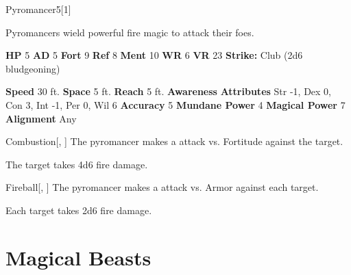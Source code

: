   
  \begin{monsection}{Pyromancer}{5}[1]
    \vspace{-1em}\vspace{-1em}
    \vspace{0em}

    
      Pyromancers wield powerful fire magic to attack their foes.
    
    

    \begin{spellcontent}
      \begin{spelltargetinginfo}
        \pari \textbf{HP} 5 \monsep
          \textbf{AD} 5 \monsep
          \textbf{Fort} 9 \monsep
          \textbf{Ref} 8 \monsep
          \textbf{Ment} 10
        \pari \textbf{WR} 6 \monsep
        \textbf{VR} 23
        \pari \textbf{Strike:}
            Club  (2d6 bludgeoning)
      \end{spelltargetinginfo}
    \end{spellcontent}
    \begin{monsterfooter}
      \pari \textbf{Speed} 30 ft. \monsep
        \textbf{Space} 5 ft. \monsep
        \textbf{Reach} 5 ft.
      \pari \textbf{Awareness} 
      \pari \textbf{Attributes}
        Str -1, Dex 0,
        Con 3, Int -1,
        Per 0, Wil 6
      \pari \textbf{Accuracy} 5 \monsep
        \textbf{Mundane Power} 4 \monsep
      \textbf{Magical Power} 7
      \pari \textbf{Alignment} Any
    \end{monsterfooter}
  \end{monsection}
  \begin{freeability}{Combustion}[, ]
       The pyromancer makes a  attack
        vs. Fortitude against the target.
    
    \hit The target takes 4d6 fire damage.
    \end{freeability}
  

    \begin{freeability}{Fireball}[, ]
       The pyromancer makes a  attack
        vs. Armor against each target.
    
    \hit Each target takes 2d6 fire damage.
    \end{freeability}
  
        \section{Magical Beasts}

